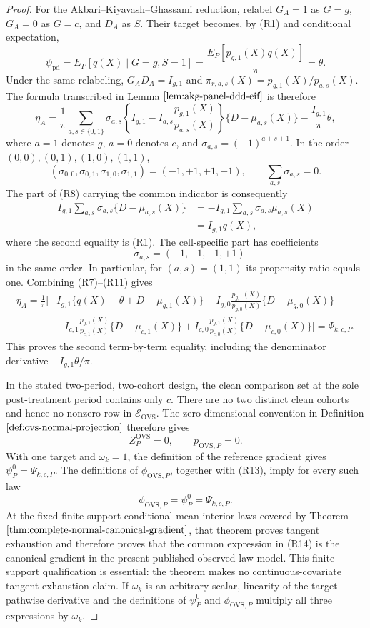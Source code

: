 \documentclass{article}
\begin{document}
\begin{proof}
For the Akbari--Kiyavash--Ghassami reduction, relabel \(G_A=1\) as \(G=g\), \(G_A=0\) as \(G=c\), and \(D_A\) as \(S\).  Their target becomes, by (R1) and conditional expectation,
\[
\psi_{\mathrm{pd}}
=E_P[q(X)\mid G=g,S=1]
=\frac{E_P[p_{g,1}(X)q(X)]}{\pi}
=\theta.
\tag{R7}
\]
Under the same relabeling, \(G_AD_A=I_{g,1}\) and
\(\pi_{r,a,s}(X)=p_{g,1}(X)/p_{a,s}(X)\).  The formula transcribed in Lemma \(\ref{lem:akg-panel-ddd-eif}\) is therefore
\[
\eta_A
=\frac1\pi\sum_{a,s\in\{0,1\}}\sigma_{a,s}
\left\{I_{g,1}-I_{a,s}\frac{p_{g,1}(X)}{p_{a,s}(X)}\right\}
\{D-\mu_{a,s}(X)\}
-\frac{I_{g,1}}\pi\theta,
\tag{R8}
\]
where \(a=1\) denotes \(g\), \(a=0\) denotes \(c\), and \(\sigma_{a,s}=(-1)^{a+s+1}\).  In the order \((0,0),(0,1),(1,0),(1,1)\),
\[
(\sigma_{0,0},\sigma_{0,1},\sigma_{1,0},\sigma_{1,1})=(-1,+1,+1,-1),
\qquad \sum_{a,s}\sigma_{a,s}=0.
\tag{R9}
\]
The part of (R8) carrying the common indicator is consequently
\[
\begin{aligned}
I_{g,1}\sum_{a,s}\sigma_{a,s}\{D-\mu_{a,s}(X)\}
&=-I_{g,1}\sum_{a,s}\sigma_{a,s}\mu_{a,s}(X)\\
&=I_{g,1}q(X),
\end{aligned}
\tag{R10}
\]
where the second equality is (R1).  The cell-specific part has coefficients
\[
-\sigma_{a,s}=(+1,-1,-1,+1)
\tag{R11}
\]
in the same order.  In particular, for \((a,s)=(1,1)\) its propensity ratio equals one.  Combining (R7)--(R11) gives
\[
\begin{aligned}
\eta_A=\frac1\pi\bigg[&I_{g,1}\{q(X)-\theta+D-\mu_{g,1}(X)\}
-I_{g,0}\frac{p_{g,1}(X)}{p_{g,0}(X)}\{D-\mu_{g,0}(X)\}\\
&-I_{c,1}\frac{p_{g,1}(X)}{p_{c,1}(X)}\{D-\mu_{c,1}(X)\}
+I_{c,0}\frac{p_{g,1}(X)}{p_{c,0}(X)}\{D-\mu_{c,0}(X)\}\bigg]
=\Psi_{k,c,P}.
\end{aligned}
\tag{R12}
\]
This proves the second term-by-term equality, including the denominator derivative \(-I_{g,1}\theta/\pi\).

In the stated two-period, two-cohort design, the clean comparison set at the sole post-treatment period contains only \(c\).  There are no two distinct clean cohorts and hence no nonzero row in \(\mathcal E_{\mathrm{OVS}}\).  The zero-dimensional convention in Definition \(\ref{def:ovs-normal-projection}\) therefore gives
\[
Z_P^{\mathrm{OVS}}=0,
\qquad p_{\mathrm{OVS},P}=0.
\tag{R13}
\]
With one target and \(\omega_k=1\), the definition of the reference gradient gives \(\psi_P^0=\Psi_{k,c,P}\).  The definitions of \(\phi_{\mathrm{OVS},P}\), together with (R13), imply for every such law
\[
\phi_{\mathrm{OVS},P}=\psi_P^0=\Psi_{k,c,P}.
\tag{R14}
\]
At the fixed-finite-support conditional-mean-interior laws covered by Theorem \(\ref{thm:complete-normal-canonical-gradient}\), that theorem proves tangent exhaustion and therefore proves that the common expression in (R14) is the canonical gradient in the present published observed-law model.  This finite-support qualification is essential: the theorem makes no continuous-covariate tangent-exhaustion claim.  If \(\omega_k\) is an arbitrary scalar, linearity of the target pathwise derivative and the definitions of \(\psi_P^0\) and \(\phi_{\mathrm{OVS},P}\) multiply all three expressions by \(\omega_k\).


\end{proof}
\end{document}
